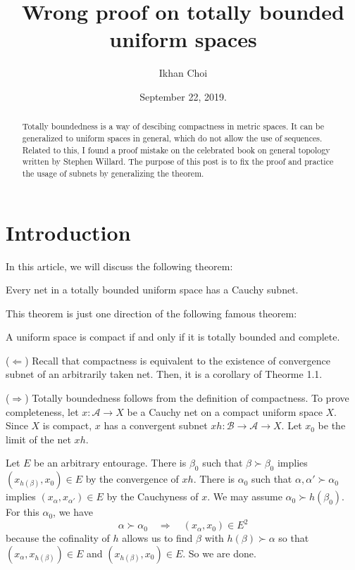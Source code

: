 \documentclass[11pt]{amsart}
\title{Wrong proof on totally bounded uniform spaces}
\author{Ikhan Choi}
\date{September 22, 2019.}
\begin{document}
\maketitle
\tableofcontents

\begin{abstract}
Totally boundedness is a way of descibing compactness in metric spaces.
It can be generalized to uniform spaces in general, which do not allow the use of sequences.
Related to this, I found a proof mistake on the celebrated book on general topology written by Stephen Willard.
The purpose of this post is to fix the proof and practice the usage of subnets by generalizing the theorem.
\end{abstract}

\clearpage
\section{Introduction}

In this article, we will discuss the following theorem:

\begin{thm}
Every net in a totally bounded uniform space has a Cauchy subnet.
\end{thm}
This theorem is just one direction of the following famous theorem:

\begin{thm}
A uniform space is compact if and only if it is totally bounded and complete.
\end{thm}

\begin{pf}
($\Leftarrow$)
Recall that compactness is equivalent to the existence of convergence subnet of an arbitrarily taken net.
Then, it is a corollary of Theorme 1.1.

($\Rightarrow$)
Totally boundedness follows from the definition of compactness.
To prove completeness, let $x:\mathcal{A}\to X$ be a Cauchy net on a compact uniform space $X$.
Since $X$ is compact, $x$ has a convergent subnet $xh:\mathcal{B}\to\mathcal{A}\to X$.
Let $x_0$ be the limit of the net $xh$.

Let $E$ be an arbitrary entourage.
There is $\beta_0$ such that $\beta\succ\beta_0$ implies $(x_{h(\beta)},x_0)\in E$ by the convergence of $xh$.
There is $\alpha_0$ such that $\alpha,\alpha'\succ\alpha_0$ implies $(x_\alpha,x_{\alpha'})\in E$ by the Cauchyness of $x$.
We may assume $\alpha_0\succ h(\beta_0)$.
For this $\alpha_0$, we have
\[\alpha\succ\alpha_0\quad\Rightarrow\quad(x_\alpha,x_0)\in E^2\]
because the cofinality of $h$ allows us to find $\beta$ with $h(\beta)\succ\alpha$ so that $(x_\alpha,x_{h(\beta)})\in E$ and $(x_{h(\beta)},x_0)\in E$.
So we are done.
\end{pf}
\end{document}
